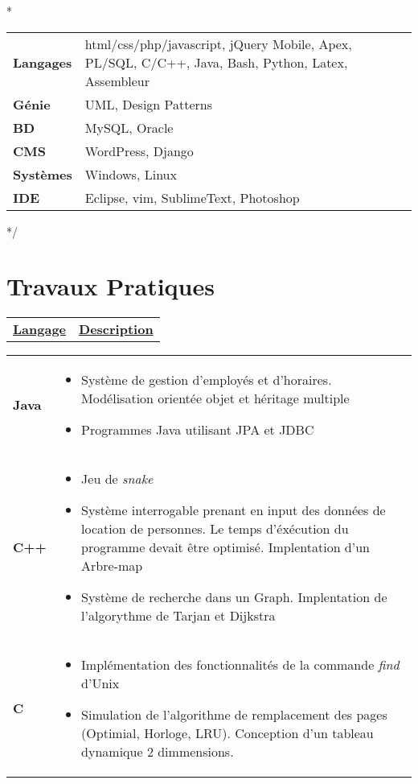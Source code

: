 \documentclass[a4paper,9pt]{extarticle}
\begin{document}
\/*
\begin{tabular}{ll}
\textbf{Langages} & 
html/css/php/javascript, jQuery Mobile, Apex, PL/SQL, C/C++, Java, Bash, Python,    Latex, Assembleur  \\
\textbf{Génie} &
UML, Design Patterns\\
\textbf{BD} & MySQL, Oracle \\
\textbf{CMS} & WordPress, Django \\
\textbf{Systèmes} & Windows, Linux \\
\textbf{IDE} & Eclipse, vim, SublimeText, Photoshop
\end{tabular}
*/


\newpage
\section{Travaux Pratiques}
\begin{tabular*}{\textwidth}{p{ }
						 	 p{ }} 
\centering\textbf{\underline{Langage}} &\centering\textbf{\underline{Description}}
\end{tabular*}

\begin{tabular*}{\linewidth}{p{ }
						 	 p{ }} 
						 	 
\textbf{Java} &  \vspace{-0.5em}
\begin{itemize}

\item Système de gestion d'employés et d'horaires. Modélisation orientée objet et héritage multiple
\item Programmes Java utilisant  JPA et JDBC 
\end{itemize}
\\
\textbf{C++} & \vspace{-0.5em}

\begin{itemize}
\item Jeu de \emph{snake}
\item Système interrogable prenant en input des données de location de personnes. Le temps d'éxécution du programme devait être optimisé. Implentation d'un Arbre-map
\item Système de recherche dans un Graph. Implentation de l'algorythme de Tarjan et Dijkstra
\end{itemize}
\\
\textbf{C} & \vspace{-0.5em}

\begin{itemize}
\item Implémentation des fonctionnalités de la commande \emph{find} d'Unix
\item Simulation de l'algorithme de remplacement des pages (Optimial, Horloge, LRU). Conception d'un tableau dynamique 2 dimmensions.
\end{itemize}


\end{tabular*}
\end{document}
